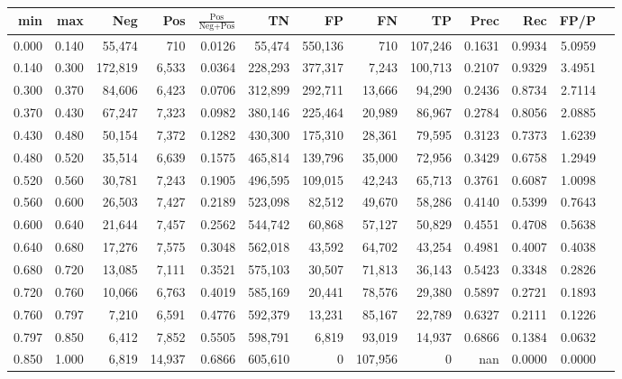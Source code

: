 \begin{tabular}{rrrrrrrrrrrrr}
\toprule
  min &   max &     Neg &    Pos & $\frac{\text{Pos}}{\text{Neg}+\text{Pos}}$ &      TN &      FP &      FN &      TP &   Prec &    Rec &   FP/P \\
\midrule
0.000 & 0.140 &  55,474 &    710 &                                     0.0126 &  55,474 & 550,136 &     710 & 107,246 & 0.1631 & 0.9934 & 5.0959 \\
0.140 & 0.300 & 172,819 &  6,533 &                                     0.0364 & 228,293 & 377,317 &   7,243 & 100,713 & 0.2107 & 0.9329 & 3.4951 \\
0.300 & 0.370 &  84,606 &  6,423 &                                     0.0706 & 312,899 & 292,711 &  13,666 &  94,290 & 0.2436 & 0.8734 & 2.7114 \\
0.370 & 0.430 &  67,247 &  7,323 &                                     0.0982 & 380,146 & 225,464 &  20,989 &  86,967 & 0.2784 & 0.8056 & 2.0885 \\
0.430 & 0.480 &  50,154 &  7,372 &                                     0.1282 & 430,300 & 175,310 &  28,361 &  79,595 & 0.3123 & 0.7373 & 1.6239 \\
0.480 & 0.520 &  35,514 &  6,639 &                                     0.1575 & 465,814 & 139,796 &  35,000 &  72,956 & 0.3429 & 0.6758 & 1.2949 \\
0.520 & 0.560 &  30,781 &  7,243 &                                     0.1905 & 496,595 & 109,015 &  42,243 &  65,713 & 0.3761 & 0.6087 & 1.0098 \\
0.560 & 0.600 &  26,503 &  7,427 &                                     0.2189 & 523,098 &  82,512 &  49,670 &  58,286 & 0.4140 & 0.5399 & 0.7643 \\
0.600 & 0.640 &  21,644 &  7,457 &                                     0.2562 & 544,742 &  60,868 &  57,127 &  50,829 & 0.4551 & 0.4708 & 0.5638 \\
0.640 & 0.680 &  17,276 &  7,575 &                                     0.3048 & 562,018 &  43,592 &  64,702 &  43,254 & 0.4981 & 0.4007 & 0.4038 \\
0.680 & 0.720 &  13,085 &  7,111 &                                     0.3521 & 575,103 &  30,507 &  71,813 &  36,143 & 0.5423 & 0.3348 & 0.2826 \\
0.720 & 0.760 &  10,066 &  6,763 &                                     0.4019 & 585,169 &  20,441 &  78,576 &  29,380 & 0.5897 & 0.2721 & 0.1893 \\
0.760 & 0.797 &   7,210 &  6,591 &                                     0.4776 & 592,379 &  13,231 &  85,167 &  22,789 & 0.6327 & 0.2111 & 0.1226 \\
0.797 & 0.850 &   6,412 &  7,852 &                                     0.5505 & 598,791 &   6,819 &  93,019 &  14,937 & 0.6866 & 0.1384 & 0.0632 \\
0.850 & 1.000 &   6,819 & 14,937 &                                     0.6866 & 605,610 &       0 & 107,956 &       0 &    nan & 0.0000 & 0.0000 \\
\bottomrule
\end{tabular}
